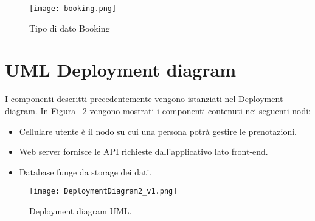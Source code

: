 \begin{figure}[!ht]
    \centering
    \texttt{[image: booking.png]}
    \caption{Tipo di dato Booking}\label{fig:BookingType}
\end{figure}

\section{UML Deployment diagram}
I componenti descritti precedentemente vengono istanziati nel Deployment diagram.
In Figura ~\ref{fig:DeploymentDiagram2} vengono mostrati i componenti contenuti nei seguenti nodi:
\begin{itemize}
    \item Cellulare utente è il nodo su cui una persona potrà gestire le prenotazioni.
    \item Web server fornisce le API richieste dall’applicativo lato front-end.
    \item Database funge da storage dei dati.
\end{itemize}

\begin{figure}[!ht]
    \centering
    \texttt{[image: DeploymentDiagram2\_v1.png]}
    \caption{Deployment diagram UML.}\label{fig:DeploymentDiagram2}
\end{figure}